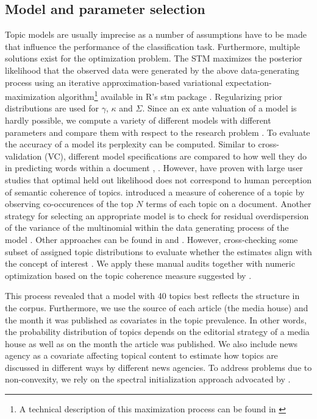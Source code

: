 \documentclass[12pt,a4paper,notitlepage]{article}
\begin{document}
\subsection{Model and parameter selection}

Topic models are usually imprecise as a number of assumptions have to be made that influence the performance of the classification task. Furthermore, multiple solutions exist for the optimization problem. The STM maximizes the posterior likelihood that the observed data were generated by the above data-generating process using an iterative approximation-based variational expectation-maximization algorithm\footnote{A technical description of this maximization process can be found in \citet{roberts_model_2016}} available in R's stm package \citep{roberts_stm:_2016}. Regularizing prior distributions are used for $\gamma$, $\kappa$ and $\Sigma$. Since an ex ante valuation of a model is hardly possible, we compute a variety of different models with different parameters and compare them with respect to the research problem \citep{gentzkow_text_2017}. To evaluate the accuracy of a model its perplexity can be computed. Similar to cross-validation (VC), different model specifications are compared to how well they do in predicting words within a document \citep{asuncion_smoothing_2012}, \citep{wallach_evaluation_2009}. However, \citet{chang_reading_2009} have proven with large user studies that optimal held out likelihood does not correspond to human perception of semantic coherence of topics. \cite{mimno_optimizing_2011} introduced a measure of coherence of a topic by observing co-occurences of the top $N$ terms of each topic on a document. Another strategy for selecting an appropriate model is to check for residual overdispersion of the variance of the multinomial within the data generating process of the model \citep{taddy_estimation_2012}. Other approaches can be found in \citet{airoldi_reconceptualizing_2010} and \citet{teh_hierarchical_2006}. However, cross-checking some subset of assigned topic distributions to evaluate whether the estimates align with the concept of interest \citep{gentzkow_text_2017}. We apply these manual audits together with numeric optimization based on the topic coherence measure suggested by \citet{mimno_optimizing_2011}. 

This process revealed that a model with 40 topics best reflects the structure in the corpus. Furthermore, we use the source of each article (the media house) and the month it was published as covariates in the topic prevalence. In other words, the probability distribution of topics depends on the editorial strategy of a media house as well as on the month the article was published. We also include news agency as a covariate affecting topical content to estimate how topics are discussed in different ways by different news agencies. To address problems due to non-convexity, we rely on the spectral initialization approach advocated by \citet{roberts_navigating_2016}. 
\end{document}
